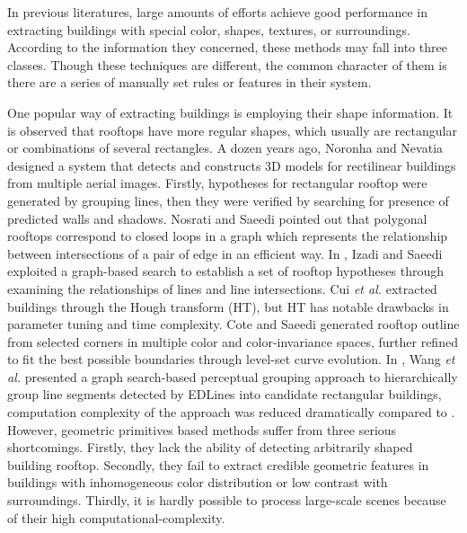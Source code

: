 \documentclass[runningheads]{llncs}
\begin{document}

   In previous literatures, large amounts of efforts achieve good performance in extracting buildings with special color, shapes, textures, or surroundings. According to the information they concerned, these methods may fall into three classes. Though these techniques are different, the common character of them is there are a series of manually set rules or features in their system.
   
   One popular way of extracting buildings is employing their shape information. It is observed that rooftops have more regular shapes, which usually are rectangular or combinations of several rectangles. A dozen years ago, Noronha and Nevatia \cite{noronha2001detection} designed a system that detects and constructs 3D models for rectilinear buildings from multiple aerial images. Firstly, hypotheses for rectangular rooftop were generated by grouping lines, then they were verified by searching for presence of predicted walls and shadows. Nosrati and Saeedi \cite{nosrati2009novel} pointed out that polygonal rooftops correspond to closed loops in a graph which represents the relationship between intersections of a pair of edge in an efficient way. In \cite{izadi2012three}, Izadi and Saeedi exploited a graph-based search to establish a set of rooftop hypotheses through examining the relationships of lines and line intersections. Cui \textit{et al.} \cite{cui2012complex} extracted buildings through the Hough transform (HT), but HT has notable drawbacks in parameter tuning and time complexity. Cote and Saeedi \cite{cote2013automatic} generated rooftop outline from selected corners in  multiple color and color-invariance spaces, further refined to fit the best possible boundaries through level-set curve evolution. In \cite{wang2015efficient}, Wang \textit{et al.}  presented a graph search-based perceptual grouping approach to hierarchically group line segments detected by EDLines \cite{akinlar2011edlines} into candidate rectangular buildings, computation complexity of the approach was reduced dramatically compared to \cite{noronha2001detection} \cite{izadi2012three} \cite{cote2013automatic} \cite{mayunga2007semi}. However, geometric primitives based methods suffer from three serious shortcomings. Firstly, they lack the ability of detecting arbitrarily shaped building rooftop. Secondly, they fail to  extract credible geometric features in buildings with inhomogeneous color distribution or low contrast with surroundings. Thirdly, it is hardly possible to process large-scale scenes because of their high computational-complexity.	
	
\end{document}
